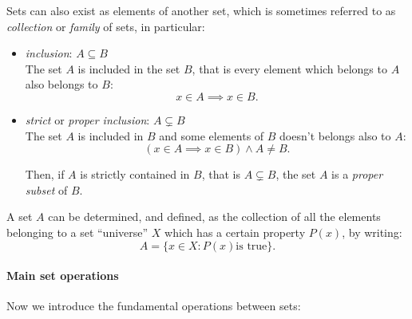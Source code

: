 \begin{defn}
	Sets can also exist as elements of another set, which is sometimes referred to as \emph{collection} or \emph{family} of sets, in particular:
	\begin{itemize}
	    \item \emph{inclusion}: $A \subseteq B$\\ The set $A$ is included in the set $B$, that is every element which belongs to $A$ also belongs to $B$:
	    $$
	    	x 
	    	\in A 
	    	\implies x \in B
	    	.
	    $$
	    \item \emph{strict} or \emph{proper inclusion}: $A \subsetneq B$\\ The set $A$ is included in $B$ and some elements of $B$ doesn't belongs also to $A$:
	    $$
	    	\left(x \in A \implies x \in B\right)
	    	\wedge A\neq B
	    .
	    $$
	    
	    Then, if $A$ is strictly contained in $B$, that is $A \subsetneq B$, the set $A$ is a \emph{proper subset} of $B$.
	\end{itemize}
\end{defn}

A set $A$ can be determined, and defined, as the collection of all the elements belonging to a set ``universe'' $X$ which has a certain property $P(x)$, by writing:
$$ 
	A 
	= \{x \in X: P(x) \text{is true}\}
.
$$

\paragraph{Main set operations} Now we introduce the fundamental operations between sets:

